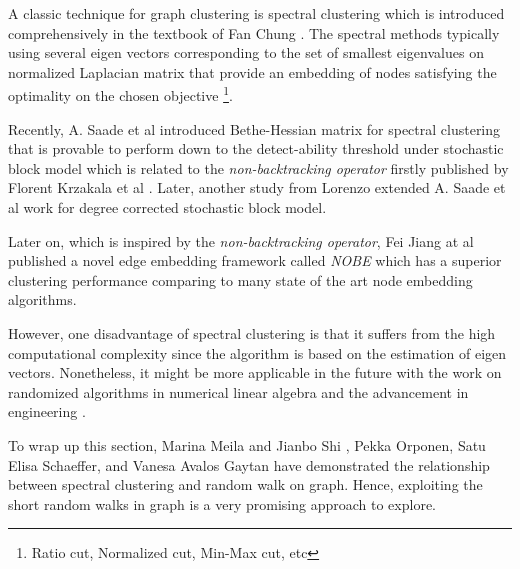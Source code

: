 A classic technique for graph clustering is spectral clustering which is introduced comprehensively in the textbook of Fan Chung \cite{chung1997spectral}. The spectral methods typically using several eigen vectors corresponding to the set of smallest eigenvalues on normalized Laplacian matrix that provide an embedding of nodes satisfying the optimality on the chosen objective \footnote{Ratio cut, Normalized cut, Min-Max cut, etc}.

Recently, A. Saade et al introduced Bethe-Hessian matrix \cite{saade2014spectral} for spectral clustering that is provable to  perform down to the detect-ability threshold under stochastic block model \cite{massoulie2014community} which is related to the \emph{non-backtracking operator} firstly published by Florent Krzakala et al \cite{krzakala2013spectral}. Later, another study from Lorenzo \cite{dall2019revisiting} extended A. Saade et al work for degree corrected stochastic block model.

Later on, which is inspired by the \emph{non-backtracking operator}, Fei Jiang at al \cite{jiang2018spectral} published a novel edge embedding framework called \emph{NOBE} which has a superior clustering performance comparing to many state of the art node embedding algorithms.

However, one disadvantage of spectral clustering is that it suffers from the high computational complexity since the algorithm is based on the estimation of eigen vectors. Nonetheless, it might be more applicable in the future with the work on randomized algorithms in numerical linear algebra \cite{kannan2017randomized} and the advancement in engineering \cite{tulloch_2016}.

To wrap up this section, Marina Meila and Jianbo Shi \cite{meila2001learning} \cite{meila2001random}, Pekka Orponen, Satu Elisa Schaeffer, and Vanesa Avalos Gaytan \cite{orponen2008locally} have demonstrated the relationship between spectral clustering and random walk on graph. Hence, exploiting the short random walks in graph is a very promising approach to explore.